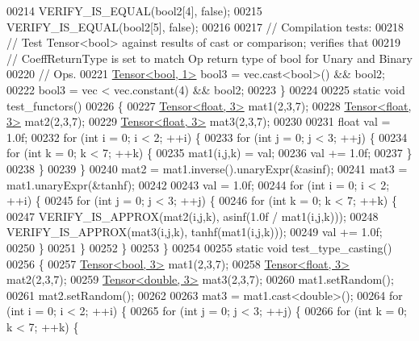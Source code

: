 \begin{DoxyCode}
00214   VERIFY\_IS\_EQUAL(bool2[4], \textcolor{keyword}{false});
00215   VERIFY\_IS\_EQUAL(bool2[5], \textcolor{keyword}{false});
00216 
00217   \textcolor{comment}{// Compilation tests:}
00218   \textcolor{comment}{// Test Tensor<bool> against results of cast or comparison; verifies that}
00219   \textcolor{comment}{// CoeffReturnType is set to match Op return type of bool for Unary and Binary}
00220   \textcolor{comment}{// Ops.}
00221   \hyperlink{class_eigen_1_1_tensor}{Tensor<bool, 1>} bool3 = vec.cast<\textcolor{keywordtype}{bool}>() && bool2;
00222   bool3 = vec < vec.constant(4) && bool2;
00223 \}
00224 
00225 \textcolor{keyword}{static} \textcolor{keywordtype}{void} test\_functors()
00226 \{
00227   \hyperlink{class_eigen_1_1_tensor}{Tensor<float, 3>} mat1(2,3,7);
00228   \hyperlink{class_eigen_1_1_tensor}{Tensor<float, 3>} mat2(2,3,7);
00229   \hyperlink{class_eigen_1_1_tensor}{Tensor<float, 3>} mat3(2,3,7);
00230 
00231   \textcolor{keywordtype}{float} val = 1.0f;
00232   \textcolor{keywordflow}{for} (\textcolor{keywordtype}{int} i = 0; i < 2; ++i) \{
00233     \textcolor{keywordflow}{for} (\textcolor{keywordtype}{int} j = 0; j < 3; ++j) \{
00234       \textcolor{keywordflow}{for} (\textcolor{keywordtype}{int} k = 0; k < 7; ++k) \{
00235         mat1(i,j,k) = val;
00236         val += 1.0f;
00237       \}
00238     \}
00239   \}
00240   mat2 = mat1.inverse().unaryExpr(&asinf);
00241   mat3 = mat1.unaryExpr(&tanhf);
00242 
00243   val = 1.0f;
00244   \textcolor{keywordflow}{for} (\textcolor{keywordtype}{int} i = 0; i < 2; ++i) \{
00245     \textcolor{keywordflow}{for} (\textcolor{keywordtype}{int} j = 0; j < 3; ++j) \{
00246       \textcolor{keywordflow}{for} (\textcolor{keywordtype}{int} k = 0; k < 7; ++k) \{
00247         VERIFY\_IS\_APPROX(mat2(i,j,k), asinf(1.0f / mat1(i,j,k)));
00248         VERIFY\_IS\_APPROX(mat3(i,j,k), tanhf(mat1(i,j,k)));
00249         val += 1.0f;
00250       \}
00251     \}
00252   \}
00253 \}
00254 
00255 \textcolor{keyword}{static} \textcolor{keywordtype}{void} test\_type\_casting()
00256 \{
00257   \hyperlink{class_eigen_1_1_tensor}{Tensor<bool, 3>} mat1(2,3,7);
00258   \hyperlink{class_eigen_1_1_tensor}{Tensor<float, 3>} mat2(2,3,7);
00259   \hyperlink{class_eigen_1_1_tensor}{Tensor<double, 3>} mat3(2,3,7);
00260   mat1.setRandom();
00261   mat2.setRandom();
00262 
00263   mat3 = mat1.cast<\textcolor{keywordtype}{double}>();
00264   \textcolor{keywordflow}{for} (\textcolor{keywordtype}{int} i = 0; i < 2; ++i) \{
00265     \textcolor{keywordflow}{for} (\textcolor{keywordtype}{int} j = 0; j < 3; ++j) \{
00266       \textcolor{keywordflow}{for} (\textcolor{keywordtype}{int} k = 0; k < 7; ++k) \{

\end{DoxyCode}
